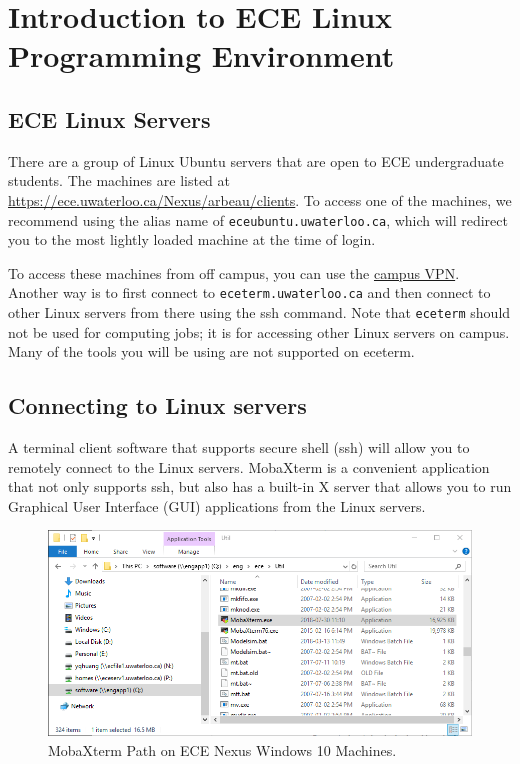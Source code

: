 \chapter{Introduction to ECE Linux Programming Environment}
\label{ch_linux_env}

\section{ECE Linux Servers}

There are a group of Linux Ubuntu servers that are open to ECE undergraduate students. The machines are listed at \url{https://ece.uwaterloo.ca/Nexus/arbeau/clients}. To access one of the machines, we recommend using the alias name of \verb+eceubuntu.uwaterloo.ca+, which will redirect you to the most lightly loaded machine at the time of login.

To access these machines from off campus, you can use the \href{https://uwaterloo.ca/information-systems-technology/services/virtual-private-network-vpn}{campus VPN}.
Another way is to first connect to \verb+eceterm.uwaterloo.ca+ and then connect to other Linux servers from there using the ssh command. Note that \verb+eceterm+ should not be used for computing jobs; it is for accessing other Linux servers on campus. Many of the tools you will be using are not supported on eceterm.

\section{Connecting to Linux servers}

A terminal client software that supports secure shell (ssh) will allow you to remotely connect to the Linux servers. MobaXterm is a convenient application that not only supports ssh, but also has a built-in X server that allows you to run Graphical User Interface (GUI) applications from the Linux servers.
\begin{figure}[!htb]
  \centering
  \includegraphics[width=5.5in]{img/lab0/MobaXterm/MobaXterm_Path}
  \caption{MobaXterm Path on ECE Nexus Windows 10 Machines.}
  \label{fig_MobaXterm_Path}
\end{figure}

